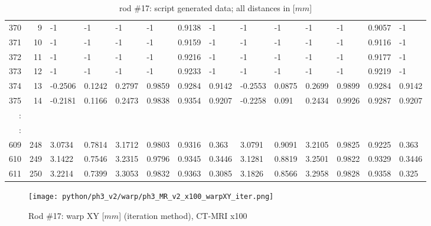 \begin{table}[p]
{\begin{minipage}{\textheight}
\begin{tabular}{rr||lll|lll||lll|lll}
370     & 9    & -1      & -1      & -1            & -1     & 0.9138 & -1             & -1       & -1       & -1             & -1      & 0.9057  & -1              \\
371     & 10   & -1      & -1      & -1            & -1     & 0.9159 & -1             & -1       & -1       & -1             & -1      & 0.9116  & -1              \\
372     & 11   & -1      & -1      & -1            & -1     & 0.9216 & -1             & -1       & -1       & -1             & -1      & 0.9177  & -1              \\
373     & 12   & -1      & -1      & -1            & -1     & 0.9233 & -1             & -1       & -1       & -1             & -1      & 0.9219  & -1              \\
374     & 13   & -0.2506 & 0.1242  & 0.2797        & 0.9859 & 0.9284 & 0.9142         & -0.2553  & 0.0875   & 0.2699         & 0.9899  & 0.9284  & 0.9142          \\
375     & 14   & -0.2181 & 0.1166  & 0.2473        & 0.9838 & 0.9354 & 0.9207         & -0.2258  & 0.091    & 0.2434         & 0.9926  & 0.9287  & 0.9207          \\
:       &      &         &         &               &        &        &                &          &          &                &         &         &                 \\
\hline
:       &      &         &         &               &        &        &                &          &          &                &         &         &                 \\
609     & 248  & 3.0734  & 0.7814  & 3.1712        & 0.9803 & 0.9316 & 0.363          & 3.0791   & 0.9091   & 3.2105         & 0.9825  & 0.9225  & 0.363           \\
610     & 249  & 3.1422  & 0.7546  & 3.2315        & 0.9796 & 0.9345 & 0.3446         & 3.1281   & 0.8819   & 3.2501         & 0.9822  & 0.9329  & 0.3446          \\
611     & 250  & 3.2214  & 0.7399  & 3.3053        & 0.9832 & 0.9363 & 0.3085         & 3.1826   & 0.8566   & 3.2958         & 0.9828  & 0.9358  & 0.325          
\end{tabular}
       \caption{rod \#17: script generated data; all distances in [$mm$]}
       \label{tab:spit-out-17}
     \end{minipage}
   }
 \end{table}

\begin{figure}[!bp]
  \centering
  \texttt{[image: python/ph3\_v2/warp/ph3\_MR\_v2\_x100\_warpXY\_iter.png]}
  \caption{Rod \#17: warp XY [$mm$] (iteration method), CT-MRI x100}
  \label{fig:ph3_warpXY_x100}
\end{figure}


